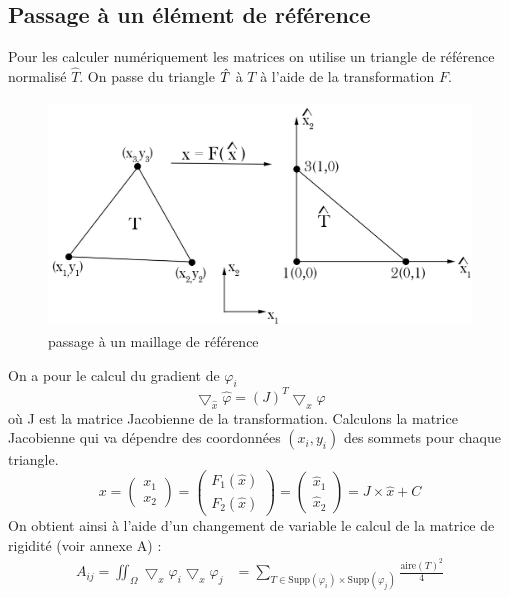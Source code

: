 \documentclass[a4paper,12pt,titlepage]{report}
\begin{document}
\begin{onehalfspace}
\subsection{Passage à un élément de référence}
Pour les calculer numériquement les matrices on utilise un triangle de référence normalisé $\hat{T}$. On passe du triangle $\Hat{T}$ à $T$ à l'aide de la transformation $F$. 
\begin{figure}[h!]
\begin{center}
\includegraphics[height = 6cm, keepaspectratio]{graphes/transformation_de_maillage.png} 
\caption{\label{figure 4 } passage à un maillage de référence}
\end{center}
\end{figure}
On a pour le calcul du gradient de $\varphi_{i}$
\[ \bigtriangledown_{\hat{x}} \hat{\varphi} = (J)^{T} \bigtriangledown_{x} \varphi  \]
où J est la matrice Jacobienne de la transformation.
Calculons la matrice Jacobienne qui va dépendre des coordonnées $(x_{i},y_{i})$ des sommets pour chaque triangle.
\[
x = \begin{pmatrix}
   x_{1} \\
   x_{2} 
\end{pmatrix}
= \begin{pmatrix}
   F_{1}(\hat{x}) \\
   F_{2}(\hat{x}) 
\end{pmatrix}
= \begin{pmatrix}
   \hat{x}_{1} \\
   \hat{x}_{2} 
\end{pmatrix}
= J \times \hat{x} + C
\]
On obtient ainsi à l'aide d'un changement de variable le calcul de la matrice de rigidité (voir annexe A) : 
\[
\boxed{
\begin{aligned}
A_{ij} = 
	\iint_{\Omega}\bigtriangledown_{x}{\varphi_{i}} \bigtriangledown_{x}{\varphi_{j}} &= 
	\sum_{T \in \text{Supp}(\varphi_{i})\times \text{Supp}(\varphi_{j})}	
	\frac{\text{aire}(T)^{2}}{4}

\end{aligned}}\]
\end{onehalfspace}
\end{document}
